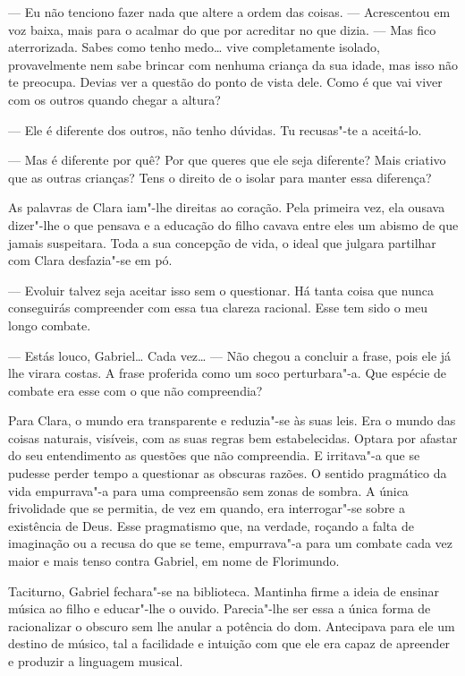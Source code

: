 --- Eu não tenciono fazer nada que altere a ordem das coisas. ---
Acrescentou em voz baixa, mais para o acalmar do que por acreditar no
que dizia. --- Mas fico aterrorizada. Sabes como tenho medo\ldots{} vive
completamente isolado, provavelmente nem sabe brincar com nenhuma
criança da sua idade, mas isso não te preocupa. Devias ver a questão do
ponto de vista dele. Como é que vai viver com os outros quando chegar a
altura?

--- Ele é diferente dos outros, não tenho dúvidas. Tu recusas"-te a
aceitá-lo.

--- Mas é diferente por quê? Por que queres que ele seja diferente? Mais
criativo que as outras crianças? Tens o direito de o isolar para manter
essa diferença?

As palavras de Clara iam"-lhe direitas ao coração. Pela primeira vez, ela
ousava dizer"-lhe o que pensava e a educação do filho cavava entre eles
um abismo de que jamais suspeitara. Toda a sua concepção de vida, o
ideal que julgara partilhar com Clara desfazia"-se em pó.

--- Evoluir talvez seja aceitar isso sem o questionar. Há tanta coisa que
nunca conseguirás compreender com essa tua clareza racional. Esse tem
sido o meu longo combate.

--- Estás louco, Gabriel\ldots{} Cada vez\ldots{} --- Não chegou a concluir a frase,
pois ele já lhe virara costas. A frase proferida como um soco
perturbara"-a. Que espécie de combate era esse com o que não compreendia?

Para Clara, o mundo era transparente e reduzia"-se às suas leis. Era o
mundo das coisas naturais, visíveis, com as suas regras bem
estabelecidas. Optara por afastar do seu entendimento as questões que
não compreendia. E irritava"-a que se pudesse perder tempo a questionar
as obscuras razões. O sentido pragmático da vida empurrava"-a para uma
compreensão sem zonas de sombra. A única frivolidade que se permitia, de
vez em quando, era interrogar"-se sobre a existência de Deus. Esse
pragmatismo que, na verdade, roçando a falta de imaginação ou a recusa
do que se teme, empurrava"-a para um combate cada vez maior e mais tenso
contra Gabriel, em nome de Florimundo.

Taciturno, Gabriel fechara"-se na biblioteca. Mantinha firme a ideia de
ensinar música ao filho e educar"-lhe o ouvido. Parecia"-lhe ser essa a
única forma de racionalizar o obscuro sem lhe anular a potência do dom.
Antecipava para ele um destino de músico, tal a facilidade e intuição
com que ele era capaz de apreender e produzir a linguagem musical.

